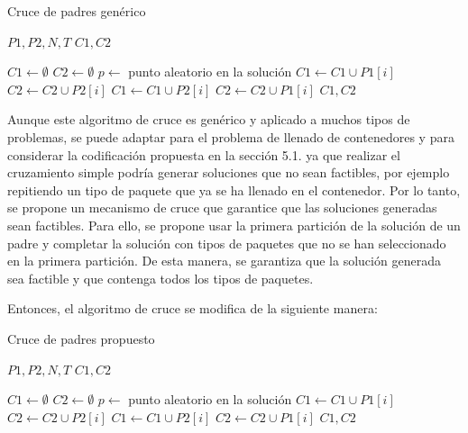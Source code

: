 \begin{algorithm}[H]
\caption{Cruce de padres genérico}\label{alg:crucePadresGenerico}
\begin{algorithmic}[1]
\Require $P1, P2, N, T$
\Ensure $C1, C2$

\State $C1 \leftarrow \emptyset$
\State $C2 \leftarrow \emptyset$
\State $p \leftarrow$ punto aleatorio en la solución
        \State $C1 \leftarrow C1 \cup P1[i]$
        \State $C2 \leftarrow C2 \cup P2[i]$
    \Else
        \State $C1 \leftarrow C1 \cup P2[i]$
        \State $C2 \leftarrow C2 \cup P1[i]$
    \EndIf
\EndFor
\State \Return $C1, C2$
\end{algorithmic}
\end{algorithm}

Aunque este algoritmo de cruce es genérico y aplicado a muchos tipos de problemas, se puede adaptar para el problema de llenado de contenedores y para considerar la codificación propuesta en la sección 5.1. ya que realizar el cruzamiento simple podría generar soluciones que no sean factibles, por ejemplo repitiendo un tipo de paquete que ya se ha llenado en el contenedor. Por lo tanto, se propone un mecanismo de cruce que garantice que las soluciones generadas sean factibles. Para ello, se propone usar la primera partición de la solución de un padre y completar la solución con tipos de paquetes que no se han seleccionado en la primera partición. De esta manera, se garantiza que la solución generada sea factible y que contenga todos los tipos de paquetes.

Entonces, el algoritmo de cruce se modifica de la siguiente manera:

\begin{algorithm}[H]
\caption{Cruce de padres propuesto}\label{alg:crucePadresPropuesto}
\begin{algorithmic}[1]
\Require $P1, P2, N, T$
\Ensure $C1, C2$

\State $C1 \leftarrow \emptyset$
\State $C2 \leftarrow \emptyset$
\State $p \leftarrow$ punto aleatorio en la solución
        \State $C1 \leftarrow C1 \cup P1[i]$
        \State $C2 \leftarrow C2 \cup P2[i]$
    \Else
                \State $C1 \leftarrow C1 \cup P2[i]$
            \EndIf
                \State $C2 \leftarrow C2 \cup P1[i]$
            \EndIf
        \EndFor
    \EndIf
\EndFor
\State \Return $C1, C2$
\end{algorithmic}
\end{algorithm}


